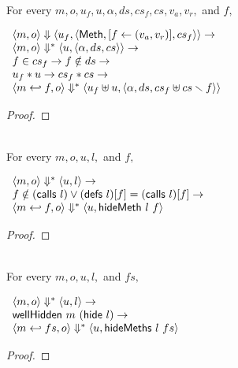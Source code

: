 \begin{lemma}
  \label{lem-inlinedmm-meth2}
  \mbox{}\\
  For every $m, o, u_f, u, \alpha, ds, cs_f, cs, v_a, v_r,$ and $f,$
  \begin{center}
    \begin{math}
      \begin{array}{l}
        \langle m, o \rangle \Downarrow \langle u_f, \langle \textsf{Meth},  [ f \leftarrow (v_a, v_r) ], cs_f \rangle \rangle \to \\
        \langle m, o \rangle \Downarrow^{\ast} \langle u, \langle \alpha, ds, cs \rangle \rangle \to \\
        f \in cs_f \to f \notin ds \to \\
        u_f \ast u \to cs_f \ast cs \to \\
        \langle m \hookleftarrow{} f, o \rangle \Downarrow^{\ast} \langle u_f \uplus u, \langle \alpha, ds, cs_f \uplus cs \smallsetminus{} f \rangle \rangle
      \end{array}
    \end{math}
  \end{center}
\end{lemma}
\begin{proof}
\end{proof}

\begin{lemma}
  \label{lem-inlinedmm}
  \mbox{}\\
  For every $m, o, u, l,$ and $f,$
  \begin{center}
    \begin{math}
      \begin{array}{l}
        \langle m, o \rangle \Downarrow^{\ast} \langle u, l \rangle \to \\
        f \notin (\textsf{calls}\ l) \vee (\textsf{defs}\ l)[f] = (\textsf{calls}\ l)[f] \to \\
        \langle m \hookleftarrow{} f, o \rangle \Downarrow^{\ast} \langle u, \textsf{hideMeth}{}\ l\ f \rangle
      \end{array}
    \end{math}
  \end{center}
\end{lemma}
\begin{proof}
\end{proof}

\begin{lemma}
  \label{lem-inlinedmssubo}
  \mbox{}\\
  For every $m, o, u, l,$ and $fs,$
  \begin{center}
    \begin{math}
      \begin{array}{l}
        \langle m, o \rangle \Downarrow^{\ast} \langle u, l \rangle \to \\
        \textsf{wellHidden}\ m\ (\textsf{hide}{}\ l) \to \\
        \langle m \hookleftarrow{} fs, o \rangle \Downarrow^{\ast} \langle u, \textsf{hideMeths}{}\ l\ fs \rangle
      \end{array}
    \end{math}
  \end{center}
\end{lemma}
\begin{proof}
\end{proof}

